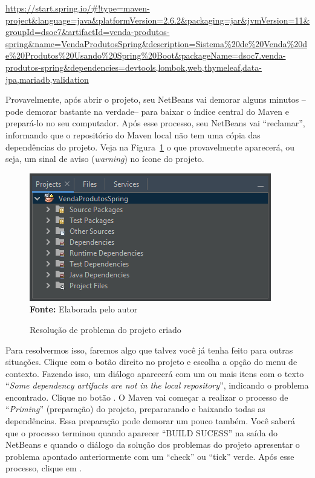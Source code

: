 \url{https://start.spring.io/#!type=maven-project&language=java&platformVersion=2.6.2&packaging=jar&jvmVersion=11&groupId=dsoc7&artifactId=venda-produtos-spring&name=VendaProdutosSpring&description=Sistema%20de%20Venda%20de%20Produtos%20Usando%20Spring%20Boot&packageName=dsoc7.venda-produtos-spring&dependencies=devtools,lombok,web,thymeleaf,data-jpa,mariadb,validation}

Provavelmente, após abrir o projeto, seu NetBeans vai demorar alguns minutos --pode demorar bastante na verdade-- para baixar o índice central do Maven e prepará-lo no seu computador. Após esse processo, seu NetBeans vai ``reclamar'', informando que o repositório do Maven local não tem uma cópia das dependências do projeto. Veja na Figura~\ref{fig:cap10ConfProjeto03} o que provavelmente aparecerá, ou seja, um sinal de aviso (\textit{warning}) no ícone do projeto.

\FloatBarrier
\begin{figure}[!htbp]
    \centering
    \caption{Resolução de problema do projeto criado}
    \includegraphics[scale=1]{imagens/cap10ConfProjeto03}
    \\\textbf{Fonte:} Elaborada pelo autor
    \label{fig:cap10ConfProjeto03}
\end{figure}
\FloatBarrier

Para resolvermos isso, faremos algo que talvez você já tenha feito para outras situações. Clique com o botão direito no projeto e escolha a opção  do menu de contexto. Fazendo isso, um diálogo aparecerá com um ou mais itens com o texto ``\textit{Some dependency artifacts are not in the local repository}'', indicando o problema encontrado. Clique no botão . O Maven vai começar a realizar o processo de ``\textit{Priming}'' (preparação) do projeto, prepararando e baixando todas as dependências. Essa preparação pode demorar um pouco também. Você saberá que o processo terminou quando aparecer ``BUILD SUCESS'' na saída do NetBeans e quando o diálogo da solução dos problemas do projeto apresentar o problema apontado anteriormente com um ``check'' ou ``tick'' verde. Após esse processo, clique em .

